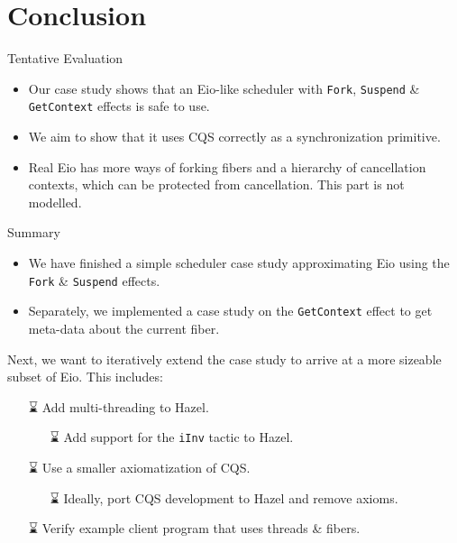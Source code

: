 \documentclass[aspectratio=43]{beamer}
\newcommand{\ocaml}[1]{\texttt{#1}}
\newcommand{\tbd}{{\symfontextra ⌛}}
\newcommand{\efork}{\ocaml{Fork}}
\newcommand{\esuspend}{\ocaml{Suspend}}
\newcommand{\egetctx}{\ocaml{GetContext}}
\begin{document}
\section{Conclusion}
\begin{frame}{Tentative Evaluation}
    \begin{itemize}
        \item Our case study shows that an Eio-like scheduler with \efork{}, \esuspend{} \& \egetctx{} effects is safe to use.
        \item We aim to show that it uses CQS correctly as a synchronization primitive.
        \item Real Eio has more ways of forking fibers and a hierarchy of cancellation contexts, which can be protected from cancellation. This part is not modelled.
    \end{itemize}
\end{frame}

\begin{frame}{Summary}
    \begin{itemize}
        \item We have finished a simple scheduler case study approximating Eio using the \efork{} \& \esuspend{} effects.
        \item Separately, we implemented a case study on the \egetctx{} effect to get meta-data about the current fiber.
    \end{itemize}
    Next, we want to iteratively extend the case study to arrive at a more sizeable subset of Eio. This includes:
    \begin{itemize}
        \item[\tbd{}] Add multi-threading to Hazel.
            \begin{itemize}
                \item[\tbd{}] Add support for the \texttt{iInv} tactic to Hazel.
            \end{itemize}
        \item[\tbd{}] Use a smaller axiomatization of CQS.
            \begin{itemize}
                \item[\tbd{}] Ideally, port CQS development to Hazel and remove axioms.
            \end{itemize}
        \item[\tbd{}] Verify example client program that uses threads \& fibers.
    \end{itemize}
\end{frame}
\end{document}
